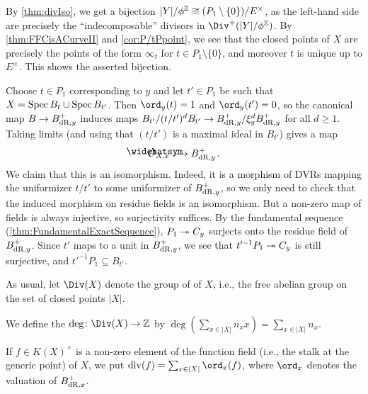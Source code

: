\begin{proof*}
	By \cref{thm:divIso}, we get a bijection $|Y|/\phi^\IZ\cong (P_1\setminus\{0\})/E^\times$, as the left-hand side are precisely the \enquote{indecomposable} divisors in $\Div^+(|Y|/\phi^\IZ)$. By \cref{thm:FFCisACurveII} and \cref{cor:P/tPpoint}, we see that the closed points of $X$ are precisely the points of the form $\infty_t$ for $t\in P_1\setminus\{0\}$, and moreover $t$ is unique up to $E^\times$. This shows the asserted bijection.
	
	Choose $t\in P_1$ corresponding to $y$ and let $t'\in P_1$ be such that $X=\operatorname{Spec} B_t\cup \operatorname{Spec} B_{t'}$. Then $\ord_y(t)=1$ and $\ord_y(t')=0$, so the canonical map $B\morphism B_{\dR,y}^+$ induces maps $B_{t'}/(t/t')^dB_{t'}\morphism B_{\dR,y}^+/\xi_y^dB_{\dR,y}^+$ for all $d\geq 1$. Taking limits (and using that $(t/t')$ is a maximal ideal in $B_{t'}$) gives a map 
	\begin{equation*}
		\roof{\Oo}_{X,x}\morphism B_{\dR,y}^+\,.
	\end{equation*}
	We claim that this is an isomorphism. Indeed, it is a morphism of DVRs mapping the uniformizer $t/t'$ to some uniformizer of $B_{\mathrm{dR},y}^+$, so we only need to check that the induced morphism on residue fields is an isomorphism. But a non-zero map of fields is always injective, so surjectivity suffices. By the fundamental sequence (\cref{thm:FundamentalExactSequence}), $P_1\epimorphism C_y$ surjects onto the residue field of $B_{\mathrm{dR},y}^+$. Since $t'$ maps to a unit in $B_{\mathrm{dR},y}^+$, we see that $t'^{-1}P_1\epimorphism C_y$ is still surjective, and $t'^{-1}P_1\subseteq B_{t'}$.
\end{proof*}
\begin{defi}\label{def:deg}
	As usual, let $\Div(X)$ denote the group of  of $X$, i.e., the free abelian group on the set of closed points $|X|$.
	\begin{numerate}
		\item We define the  $\deg\colon \Div(X)\morphism \IZ$ by $\deg\left(\sum_{x\in |X|}n_xx\right)=\sum_{x\in |X|}n_x$.
		\item If $f\in K(X)^\times$ is a non-zero element of the function field (i.e., the stalk at the generic point) of $X$, we put $\div(f)=\sum_{x\in |X|}\ord_x(f)$, where $\ord_x$ denotes the valuation of $B_{\mathrm{dR},x}^+$.
	\end{numerate}
\end{defi}
